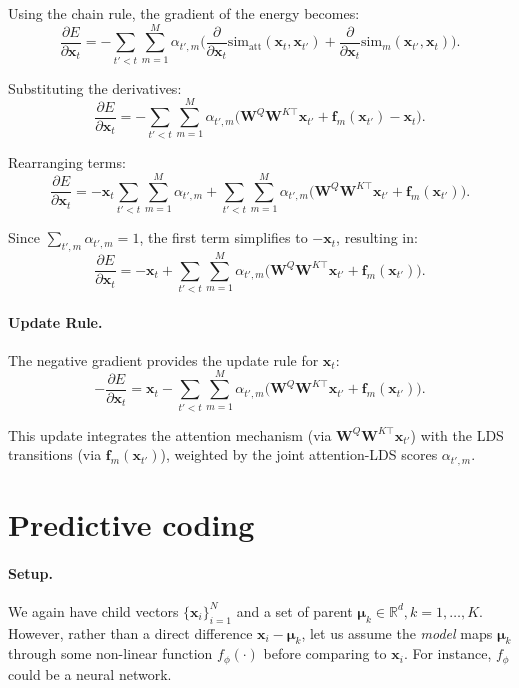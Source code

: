 \documentclass{article}
\begin{document}
Using the chain rule, the gradient of the energy becomes:
\[
\frac{\partial E}{\partial \bm{x}_t} = -\sum_{t' < t} \sum_{m=1}^M \alpha_{t',m} \Big( \frac{\partial}{\partial \bm{x}_t} \mathrm{sim}_{\text{att}}(\bm{x}_t, \bm{x}_{t'}) + \frac{\partial}{\partial \bm{x}_t} \mathrm{sim}_m(\bm{x}_{t'}, \bm{x}_t) \Big).
\]

Substituting the derivatives:
\[
\frac{\partial E}{\partial \bm{x}_t} = -\sum_{t' < t} \sum_{m=1}^M \alpha_{t',m} \Big( \bm{W}^Q \bm{W}^{K\top} \bm{x}_{t'} + \bm{f}_m(\bm{x}_{t'}) - \bm{x}_t \Big).
\]

Rearranging terms:
\[
\frac{\partial E}{\partial \bm{x}_t} = -\bm{x}_t \sum_{t' < t} \sum_{m=1}^M \alpha_{t',m} + \sum_{t' < t} \sum_{m=1}^M \alpha_{t',m} \Big( \bm{W}^Q \bm{W}^{K\top} \bm{x}_{t'} + \bm{f}_m(\bm{x}_{t'}) \Big).
\]

Since \(\sum_{t',m} \alpha_{t',m} = 1\), the first term simplifies to \(-\bm{x}_t\), resulting in:
\[
\frac{\partial E}{\partial \bm{x}_t} = -\bm{x}_t + \sum_{t' < t} \sum_{m=1}^M \alpha_{t',m} \Big( \bm{W}^Q \bm{W}^{K\top} \bm{x}_{t'} + \bm{f}_m(\bm{x}_{t'}) \Big).
\]

\paragraph{Update Rule.}
The negative gradient provides the update rule for \(\bm{x}_t\):
\[
-\frac{\partial E}{\partial \bm{x}_t} = \bm{x}_t - \sum_{t' < t} \sum_{m=1}^M \alpha_{t',m} \Big( \bm{W}^Q \bm{W}^{K\top} \bm{x}_{t'} + \bm{f}_m(\bm{x}_{t'}) \Big).
\]

This update integrates the attention mechanism (via \(\bm{W}^Q \bm{W}^{K\top} \bm{x}_{t'}\)) with the LDS transitions (via \(\bm{f}_m(\bm{x}_{t'})\)), weighted by the joint attention-LDS scores \(\alpha_{t',m}\).





    

\section{Predictive coding}

\paragraph{Setup.}
We again have child vectors \(\{\bm{x}_i\}_{i=1}^N\) and a set of parent \(\bm{\mu}_k \in \mathbb{R}^d, k=1,\dots,K\).  However, rather than a direct difference \(\bm{x}_i-\bm{\mu}_k\), let us assume the \emph{model} maps \(\bm{\mu}_k\) through some non-linear function \(f_\phi(\cdot)\) before comparing to \(\bm{x}_i\).  For instance, \(f_\phi\) could be a neural network.
\end{document}
